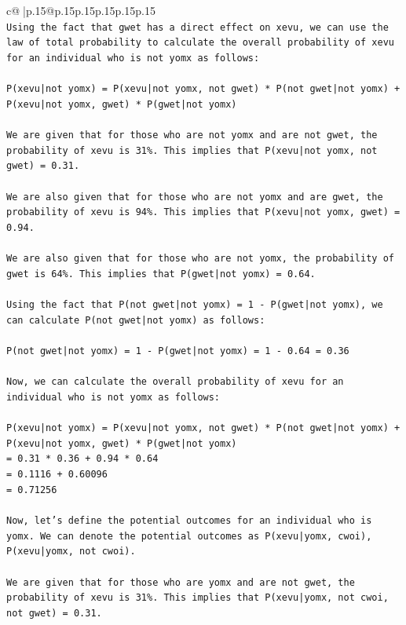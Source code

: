 \documentclass{article}
\begin{document}
{\begin{supertabular}{c@{$\;$}|p{.15\linewidth}@{}p{.15\linewidth}p{.15\linewidth}p{.15\linewidth}p{.15\linewidth}p{.15\linewidth}}
{{{\\ 
\texttt{Using the fact that gwet has a direct effect on xevu, we can use the law of total probability to calculate the overall probability of xevu for an individual who is not yomx as follows:} \\
\\ 
\texttt{P(xevu|not yomx) = P(xevu|not yomx, not gwet) * P(not gwet|not yomx) + P(xevu|not yomx, gwet) * P(gwet|not yomx)} \\
\\ 
\texttt{We are given that for those who are not yomx and are not gwet, the probability of xevu is 31\%. This implies that P(xevu|not yomx, not gwet) = 0.31.} \\
\\ 
\texttt{We are also given that for those who are not yomx and are gwet, the probability of xevu is 94\%. This implies that P(xevu|not yomx, gwet) = 0.94.} \\
\\ 
\texttt{We are also given that for those who are not yomx, the probability of gwet is 64\%. This implies that P(gwet|not yomx) = 0.64.} \\
\\ 
\texttt{Using the fact that P(not gwet|not yomx) = 1 {-} P(gwet|not yomx), we can calculate P(not gwet|not yomx) as follows:} \\
\\ 
\texttt{P(not gwet|not yomx) = 1 {-} P(gwet|not yomx) = 1 {-} 0.64 = 0.36} \\
\\ 
\texttt{Now, we can calculate the overall probability of xevu for an individual who is not yomx as follows:} \\
\\ 
\texttt{P(xevu|not yomx) = P(xevu|not yomx, not gwet) * P(not gwet|not yomx) + P(xevu|not yomx, gwet) * P(gwet|not yomx)} \\
\texttt{= 0.31 * 0.36 + 0.94 * 0.64} \\
\texttt{= 0.1116 + 0.60096} \\
\texttt{= 0.71256} \\
\\ 
\texttt{Now, let's define the potential outcomes for an individual who is yomx. We can denote the potential outcomes as P(xevu|yomx, cwoi), P(xevu|yomx, not cwoi). } \\
\\ 
\texttt{We are given that for those who are yomx and are not gwet, the probability of xevu is 31\%. This implies that P(xevu|yomx, not cwoi, not gwet) = 0.31. } \\
}}}
\end{supertabular}}
\end{document}
